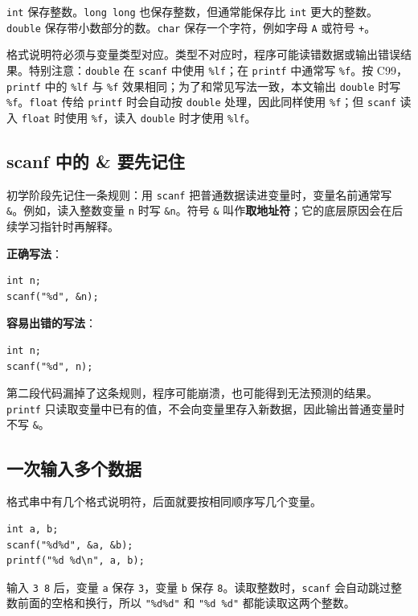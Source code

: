 \documentclass[UTF8,zihao=-4,fontset=windows]{ctexart}
\newcommand{\term}[1]{\textbf{\color{navy}#1}}
\newcommand{\good}{\textbf{\color{green}正确写法}}
\newcommand{\bad}{\textbf{\color{red}容易出错的写法}}
\begin{document}
\verb|int| 保存整数。\verb|long long| 也保存整数，但通常能保存比 \verb|int| 更大的整数。\verb|double| 保存带小数部分的数。\verb|char| 保存一个字符，例如字母 \verb|A| 或符号 \verb|+|。

格式说明符必须与变量类型对应。类型不对应时，程序可能读错数据或输出错误结果。特别注意：\verb|double| 在 \verb|scanf| 中使用 \verb|%lf|；在 \verb|printf| 中通常写 \verb|%f|。按 C99，\verb|printf| 中的 \verb|%lf| 与 \verb|%f| 效果相同；为了和常见写法一致，本文输出 \verb|double| 时写 \verb|%f|。\verb|float| 传给 \verb|printf| 时会自动按 \verb|double| 处理，因此同样使用 \verb|%f|；但 \verb|scanf| 读入 \verb|float| 时使用 \verb|%f|，读入 \verb|double| 时才使用 \verb|%lf|。

\subsection{scanf 中的 \& 要先记住}

初学阶段先记住一条规则：用 \verb|scanf| 把普通数据读进变量时，变量名前通常写 \verb|&|。例如，读入整数变量 \verb|n| 时写 \verb|&n|。符号 \verb|&| 叫作\term{取地址符}；它的底层原因会在后续学习指针时再解释。

\good：
\begin{lstlisting}[style=cstyle]
int n;
scanf("%d", &n);
\end{lstlisting}

\bad：
\begin{lstlisting}[style=cstyle]
int n;
scanf("%d", n);
\end{lstlisting}

第二段代码漏掉了这条规则，程序可能崩溃，也可能得到无法预测的结果。\verb|printf| 只读取变量中已有的值，不会向变量里存入新数据，因此输出普通变量时不写 \verb|&|。

\subsection{一次输入多个数据}

格式串中有几个格式说明符，后面就要按相同顺序写几个变量。

\begin{lstlisting}[style=cstyle]
int a, b;
scanf("%d%d", &a, &b);
printf("%d %d\n", a, b);
\end{lstlisting}

输入 \verb|3 8| 后，变量 \verb|a| 保存 \verb|3|，变量 \verb|b| 保存 \verb|8|。读取整数时，\verb|scanf| 会自动跳过整数前面的空格和换行，所以 \verb|"%d%d"| 和 \verb|"%d %d"| 都能读取这两个整数。
\end{document}
